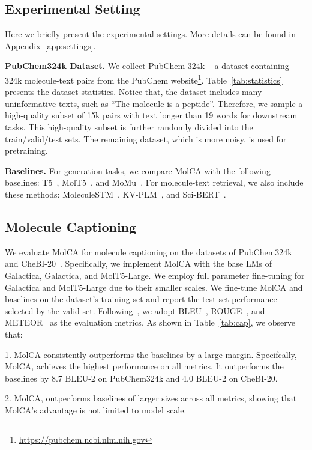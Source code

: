 \documentclass[11pt]{article}
\begin{document}
\subsection{Experimental Setting}
Here we briefly present the experimental settings. More details can be found in Appendix~\ref{app:settings}.

\textbf{PubChem324k Dataset.} We collect PubChem-324k -- a dataset containing 324k molecule-text pairs from the PubChem website\footnote{\url{https://pubchem.ncbi.nlm.nih.gov}}. Table~\ref{tab:statistics} presents the dataset statistics. Notice that, the dataset includes many uninformative texts, such as ``The molecule is a peptide''. Therefore, we sample a high-quality subset of 15k pairs with text longer than 19 words for downstream tasks. This high-quality subset is further randomly divided into the train/valid/test sets. The remaining dataset, which is more noisy, is used for pretraining.


\textbf{Baselines.} For generation tasks, we compare MolCA with the following baselines: T5~\cite{T5}, MolT5~\cite{MolT5}, and MoMu~\cite{MoMu}. For molecule-text retrieval, we also include these methods: MoleculeSTM~\cite{MoleculeSTM}, KV-PLM~\cite{KVPLM}, and Sci-BERT~\cite{SciBERT}. 




\subsection{Molecule Captioning}
We evaluate MolCA for molecule captioning on the datasets of PubChem324k and CheBI-20~\cite{MolT5}. Specifically, we implement MolCA with the base LMs of Galactica, Galactica, and MolT5-Large. We employ full parameter fine-tuning for Galactica and MolT5-Large due to their smaller scales. We fine-tune MolCA and baselines on the dataset's training set and report the test set performance selected by the valid set. Following~\cite{MolT5}, we adopt BLEU~\cite{BLEU}, ROUGE~\cite{ROUGE}, and METEOR~\cite{METEOR} as the evaluation metrics. As shown in Table~\ref{tab:cap}, we observe that:

1. MolCA consistently outperforms the baselines by a large margin. Specifcally, MolCA,  achieves the highest performance on all metrics. It outperforms the baselines by 8.7 BLEU-2 on PubChem324k and 4.0 BLEU-2 on CheBI-20. 

2. MolCA,  outperforms baselines of larger sizes across all metrics, showing that MolCA's advantage is not limited to model scale.
\end{document}
